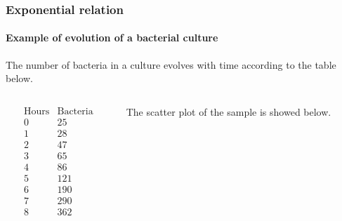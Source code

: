 \begin{frame}
\frametitle{Exponential relation}
\framesubtitle{Example of evolution of a bacterial culture}
The number of bacteria in a culture evolves with time according to the table below.
\begin{columns}
\begin{column}{0.3\textwidth}
\[
\begin{array}{c|c}
\mbox{Hours} & \mbox{Bacteria}\\
\hline
0 &  25 \\
1 & 28 \\
2 &  47\\
3 & 65 \\
4 & 86\\
5 & 121\\
6 & 190\\
7 & 290\\
8 & 362
\end{array}
\]
\end{column}
\begin{column}{0.6\textwidth}
The scatter plot of the sample is showed below.
\begin{center}
\end{center}
\end{column}
\end{columns}
\end{frame}


